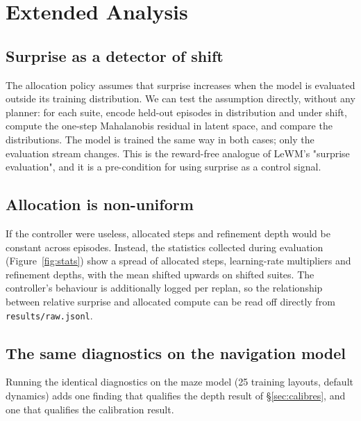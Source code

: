 \section{Extended Analysis}

\subsection{Surprise as a detector of shift}

The allocation policy assumes that surprise increases when the model is evaluated outside its
training distribution. We can test the assumption directly, without any planner: for each
suite, encode held-out episodes in distribution and under shift, compute the one-step
Mahalanobis residual in latent space, and compare the distributions. The model is trained the
same way in both cases; only the evaluation stream changes. This is the reward-free analogue
of LeWM's "surprise evaluation", and it is a pre-condition for using surprise as a control
signal.

\subsection{Allocation is non-uniform}

If the controller were useless, allocated steps and refinement depth would be constant across
episodes. Instead, the statistics collected during evaluation (Figure~\ref{fig:stats}) show a
spread of allocated steps, learning-rate multipliers and refinement depths, with the mean
shifted upwards on shifted suites. The controller's behaviour is additionally logged per
replan, so the relationship between relative surprise and allocated compute can be read off
directly from \texttt{results/raw.jsonl}.

\subsection{The same diagnostics on the navigation model}\label{app:maze}

Running the identical diagnostics on the maze model (25 training layouts, default dynamics)
adds one finding that qualifies the depth result of \S\ref{sec:calibres}, and one that
qualifies the calibration result.

